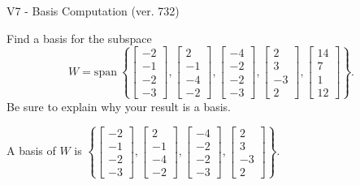 \begin{exercise}
  \begin{exerciseTitle}V7 - Basis Computation (ver. 732)\end{exerciseTitle}
  \begin{exerciseStatement}
    Find a basis for the subspace 
\[W=\mathrm{span}\ \left\{\left[\begin{array}{r}
-2 \\
-1 \\
-2 \\
-3
\end{array}\right] , \left[\begin{array}{r}
2 \\
-1 \\
-4 \\
-2
\end{array}\right] , \left[\begin{array}{r}
-4 \\
-2 \\
-2 \\
-3
\end{array}\right] , \left[\begin{array}{r}
2 \\
3 \\
-3 \\
2
\end{array}\right] , \left[\begin{array}{r}
14 \\
7 \\
1 \\
12
\end{array}\right]\right\}.\]
 Be sure to explain why your result is a basis.


  \end{exerciseStatement}
  \begin{exerciseAnswer}
   A basis of \(W\) is  \(\left\{\left[\begin{array}{r}
-2 \\
-1 \\
-2 \\
-3
\end{array}\right] , \left[\begin{array}{r}
2 \\
-1 \\
-4 \\
-2
\end{array}\right] , \left[\begin{array}{r}
-4 \\
-2 \\
-2 \\
-3
\end{array}\right] , \left[\begin{array}{r}
2 \\
3 \\
-3 \\
2
\end{array}\right]\right\}\).
  


  \end{exerciseAnswer}
\end{exercise}